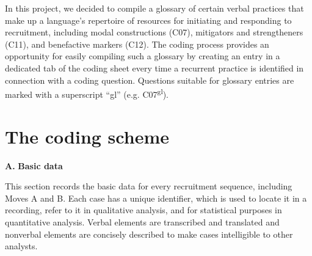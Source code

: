 \documentclass[output=paper]{langsci/langscibook}
\begin{document}
In this project, we decided to compile a glossary of certain verbal practices that make up a language’s repertoire of resources for initiating and responding to recruitment, including modal constructions (C07), mitigators and strengtheners (C11), and benefactive markers (C12). The coding process provides an opportunity for easily compiling such a glossary by creating an entry in a dedicated tab of the coding sheet every time a recurrent practice is identified in connection with a coding question. Questions suitable for glossary entries are marked with a superscript “gl” (e.g. C07\textsuperscript{gl}).

\section{The coding scheme}\label{sec:coding:6}

\noindent \textbf{A.} \textbf{Basic data}

\medskip

\noindent This section records the basic data for every recruitment sequence, including Moves A and B. Each case has a unique identifier, which is used to locate it in a recording, refer to it in qualitative analysis, and for statistical purposes in quantitative analysis. Verbal elements are transcribed and translated and nonverbal elements are concisely described to make cases intelligible to other analysts.
\end{document}
